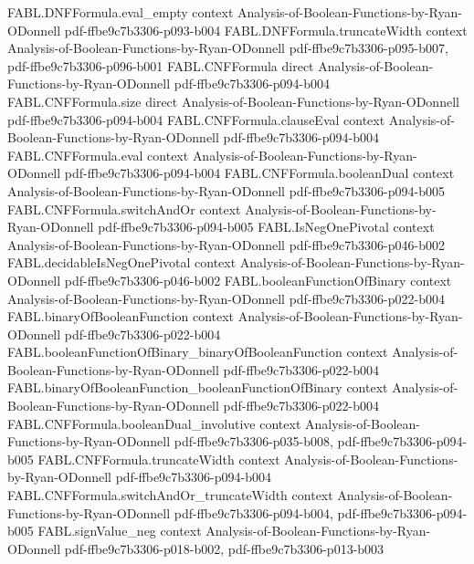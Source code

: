 \begin{theorem}
\proofstep
  {FABL.DNFFormula.eval_empty}
  {context}
  {Analysis-of-Boolean-Functions-by-Ryan-ODonnell}
  {pdf-ffbe9c7b3306-p093-b004}
\proofstep
  {FABL.DNFFormula.truncateWidth}
  {context}
  {Analysis-of-Boolean-Functions-by-Ryan-ODonnell}
  {pdf-ffbe9c7b3306-p095-b007,
    pdf-ffbe9c7b3306-p096-b001}
\proofstep
  {FABL.CNFFormula}
  {direct}
  {Analysis-of-Boolean-Functions-by-Ryan-ODonnell}
  {pdf-ffbe9c7b3306-p094-b004}
\proofstep
  {FABL.CNFFormula.size}
  {direct}
  {Analysis-of-Boolean-Functions-by-Ryan-ODonnell}
  {pdf-ffbe9c7b3306-p094-b004}
\proofstep
  {FABL.CNFFormula.clauseEval}
  {context}
  {Analysis-of-Boolean-Functions-by-Ryan-ODonnell}
  {pdf-ffbe9c7b3306-p094-b004}
\proofstep
  {FABL.CNFFormula.eval}
  {context}
  {Analysis-of-Boolean-Functions-by-Ryan-ODonnell}
  {pdf-ffbe9c7b3306-p094-b004}
\proofstep
  {FABL.CNFFormula.booleanDual}
  {context}
  {Analysis-of-Boolean-Functions-by-Ryan-ODonnell}
  {pdf-ffbe9c7b3306-p094-b005}
\proofstep
  {FABL.CNFFormula.switchAndOr}
  {context}
  {Analysis-of-Boolean-Functions-by-Ryan-ODonnell}
  {pdf-ffbe9c7b3306-p094-b005}
\proofstep
  {FABL.IsNegOnePivotal}
  {context}
  {Analysis-of-Boolean-Functions-by-Ryan-ODonnell}
  {pdf-ffbe9c7b3306-p046-b002}
\proofstep
  {FABL.decidableIsNegOnePivotal}
  {context}
  {Analysis-of-Boolean-Functions-by-Ryan-ODonnell}
  {pdf-ffbe9c7b3306-p046-b002}
\proofstep
  {FABL.booleanFunctionOfBinary}
  {context}
  {Analysis-of-Boolean-Functions-by-Ryan-ODonnell}
  {pdf-ffbe9c7b3306-p022-b004}
\proofstep
  {FABL.binaryOfBooleanFunction}
  {context}
  {Analysis-of-Boolean-Functions-by-Ryan-ODonnell}
  {pdf-ffbe9c7b3306-p022-b004}
\proofstep
  {FABL.booleanFunctionOfBinary_binaryOfBooleanFunction}
  {context}
  {Analysis-of-Boolean-Functions-by-Ryan-ODonnell}
  {pdf-ffbe9c7b3306-p022-b004}
\proofstep
  {FABL.binaryOfBooleanFunction_booleanFunctionOfBinary}
  {context}
  {Analysis-of-Boolean-Functions-by-Ryan-ODonnell}
  {pdf-ffbe9c7b3306-p022-b004}
\proofstep
  {FABL.CNFFormula.booleanDual_involutive}
  {context}
  {Analysis-of-Boolean-Functions-by-Ryan-ODonnell}
  {pdf-ffbe9c7b3306-p035-b008,
    pdf-ffbe9c7b3306-p094-b005}
\proofstep
  {FABL.CNFFormula.truncateWidth}
  {context}
  {Analysis-of-Boolean-Functions-by-Ryan-ODonnell}
  {pdf-ffbe9c7b3306-p094-b004}
\proofstep
  {FABL.CNFFormula.switchAndOr_truncateWidth}
  {context}
  {Analysis-of-Boolean-Functions-by-Ryan-ODonnell}
  {pdf-ffbe9c7b3306-p094-b004,
    pdf-ffbe9c7b3306-p094-b005}
\proofstep
  {FABL.signValue_neg}
  {context}
  {Analysis-of-Boolean-Functions-by-Ryan-ODonnell}
  {pdf-ffbe9c7b3306-p018-b002,
    pdf-ffbe9c7b3306-p013-b003}

\end{theorem}
